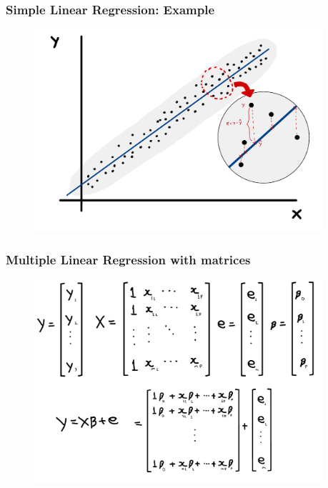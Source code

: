 \begin{frame}
    \frametitle{Simple Linear Regression: Example}
    \begin{figure}
        \centering
        \includegraphics[width=0.95\textwidth]{sections/introduction/figures/linear_plot_with_error.pdf}
    \end{figure}
\end{frame}


\begin{frame}
    \frametitle{Multiple Linear Regression with matrices}
    \begin{figure}
        \centering
        \includegraphics[width=0.95\textwidth]{sections/introduction/figures/matrix_form.pdf}
    \end{figure}
\end{frame}



